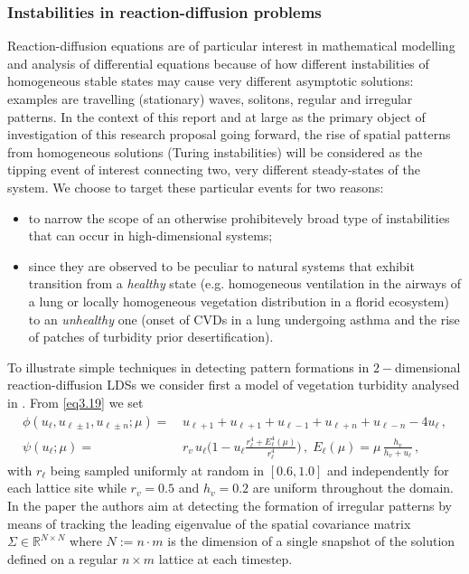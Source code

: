 \documentclass[../main.tex]{subfiles}
\begin{document}
\subsubsection{Instabilities in reaction-diffusion problems}\label{subsubsec3.2.2}
Reaction-diffusion equations are of particular interest in mathematical modelling and analysis of differential equations because of how different instabilities of homogeneous stable states may cause very different asymptotic solutions: examples are travelling (stationary) waves, solitons, regular and irregular patterns.
In the context of this report and at large as the primary object of investigation of this research proposal going forward, the rise of spatial patterns from homogeneous solutions (Turing instabilities) will be considered as the tipping event of interest connecting two, very different steady-states of the system. 
We choose to target these particular events for two reasons:
\begin{itemize}
     \item to narrow the scope of an otherwise prohibitevely broad type of instabilities that can occur in high-dimensional systems;
     \item since they are observed to be peculiar to natural systems that exhibit transition from a \textit{healthy} state (e.g. homogeneous ventilation in the airways of a lung or locally homogeneous vegetation distribution in a florid ecosystem) to an \textit{unhealthy} one (onset of CVDs in a lung undergoing asthma and the rise of patches of turbidity prior desertification).
\end{itemize}
To illustrate simple techniques in detecting pattern formations in $2-$dimensional reaction-diffusion LDSs we consider first a model of vegetation turbidity analysed in \cite{Chen19}. From \eqref{eq3.19} we set
\begin{align}
        \phi(u_{\ell}, u_{\ell\pm1},u_{\ell\pm n}; \mu) =&\, u_{\ell+1}+ u_{\ell+1}+ u_{\ell-1} + u_{\ell+n} + u_{\ell-n}-4u_{\ell}\,, \nonumber \\
        \psi(u_{\ell}; \mu) =&\,r_{v}\,u_{\ell}\bigg(1-u_{\ell}\frac{r_{\ell}^{4}+E_{\ell}^{4}(\mu)}{r_{\ell}^{4}}\bigg)\,,\;E_{\ell}(\mu)=\mu\,\frac{h_{v}}{h_{v}+u_{\ell}} \,,\nonumber
\end{align}
with $r_{\ell}$ being sampled uniformly at random in $[0.6, 1.0]$ and independently for each lattice site while $r_{v} = 0.5$ and $h_{v} = 0.2$ are uniform throughout the domain. 
In the paper the authors aim at detecting the formation of irregular patterns by means of tracking the leading eigenvalue of the spatial covariance matrix $\Sigma\in \mathbb{R}^{N\times N}$ where $N:={n\cdot m}$ is the dimension of a single snapshot of the solution defined on a regular $n\times m$ lattice at each timestep.
\end{document}
